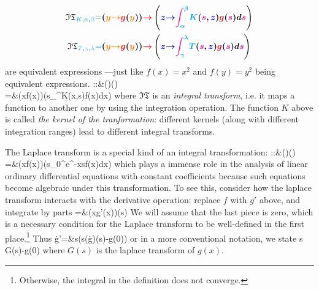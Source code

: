 {	\begin{equation*}
		\begin{aligned}
			\mathfrak{IT}_{\textcolor{cyan}{K},\textcolor{cyan}{\alpha},\textcolor{cyan}{\beta}}\textcolor{cyan}{=}{}&\bm{(\textcolor{orange}{y}\textcolor{orange}{\to} \textcolor{red}{g}(\textcolor{orange}{y}))\textcolor{red}{\to}\left(\textcolor{blue}{z}\textcolor{blue}{\to}\textcolor{magenta}{\int_{\textcolor{cyan}{\alpha}}^{\textcolor{cyan}{\beta}}} \textcolor{cyan}{K}(\textcolor{magenta}{s},\textcolor{blue}{z})\textcolor{red}{g}(\textcolor{magenta}{s})d\textcolor{magenta}{s}\right)}
			\\
			\mathfrak{IT}_{\textcolor{cyan}{T},\textcolor{cyan}{\gamma},\textcolor{cyan}{\lambda}}\textcolor{cyan}{=}{}&\bm{(\textcolor{orange}{y}\textcolor{orange}{\to} \textcolor{red}{g}(\textcolor{orange}{y})) \textcolor{red}{\to}\left(\textcolor{blue}{z}\textcolor{blue}{\to}\textcolor{magenta}{\int_{\textcolor{cyan}{\gamma}}^{\textcolor{cyan}{\lambda}}} \textcolor{cyan}{T}(\textcolor{magenta}{s},\textcolor{blue}{z})\textcolor{red}{g}(\textcolor{magenta}{s})d\textcolor{magenta}{s}\right)}
		\end{aligned}
	\end{equation*}
	are equivalent expressions ---just like \mbox{$f(x)=x^2$} and \mbox{$f(y)=y^2$} being equivalent expressions.
}
::{}&(\C\to\C)\to (\C\to\C)\\
={}&(x\to f(x))\to\left(s\to\int\limits_\a^\b K(x,s)f(x)dx\right)
\eea 
where $\mathfrak{IT}$ is an \emph{integral transform}, i.e. it maps a function to another one by using the integration operation. The function $K$ above is called \emph{the kernel of the tranformation}: different kernels (along with different integration ranges) lead to different integral transforms.

The Laplace transform is a special kind of an integral transformation:
\cL::{}&(\C\to\C)\to (\C\to\C)\\
\cL={}&(x\to f(x))\to\left(s\to\int\limits_0^\infty e^{-xs}f(x)dx\right)
\eea 
which plays a immense role in the analysis of linear ordinary differential equations with constant coefficients because such equations become algebraic under this transformation. To see this, consider how the laplace transform interacts with the derivative operation: replace $f$ with $g'$ above, and integrate by parts
\be 
\cL={}&(x\to g'(x))\to\left(s\to {}\right)
\ee 
We will assume that the last piece is zero, which is a necessary condition for the Laplace transform to be well-defined in the first place.\footnote{Otherwise, the integral in the definition does not converge.} Thus
\be 
\cL\.g'={}&s\to \left(s(\cL\.g)(s)-g(0)\right)
\ee 
or in a more conventional notation, we state
\be 
{} s G(s)-g(0)
\ee 
where $G(s)$ is the laplace transform of $g(x)$.

